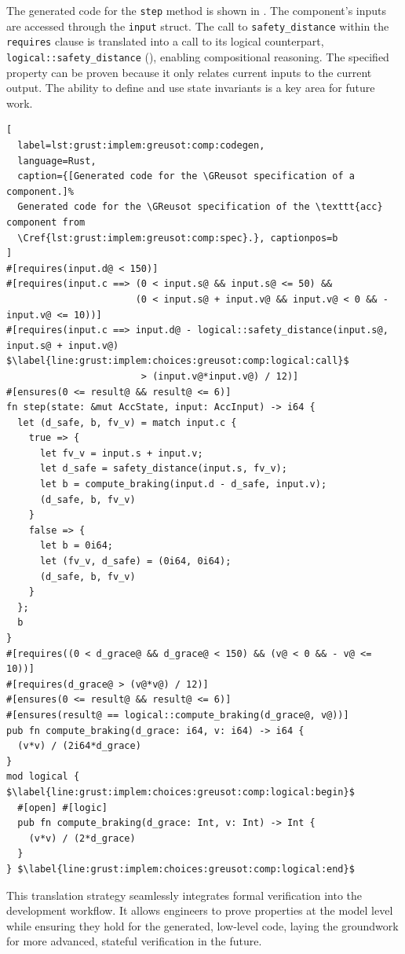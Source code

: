 The generated code for the \texttt{step} method is shown in
. The component's inputs are accessed through the
\texttt{input} struct. The call to \texttt{safety\_distance} within the \texttt{requires} clause is
translated into a call to its logical counterpart, \texttt{logical::safety\_distance}
(), enabling compositional reasoning.
The specified property can be proven because it only relates current inputs to the current output.
The ability to define and use state invariants is a key area for future work.

\begin{lstlisting}[
  label=lst:grust:implem:greusot:comp:codegen,
  language=Rust,
  caption={[Generated code for the \GReusot specification of a component.]%
  Generated code for the \GReusot specification of the \texttt{acc} component from
  \Cref{lst:grust:implem:greusot:comp:spec}.}, captionpos=b
]
#[requires(input.d@ < 150)]
#[requires(input.c ==> (0 < input.s@ && input.s@ <= 50) &&
                       (0 < input.s@ + input.v@ && input.v@ < 0 && - input.v@ <= 10))]
#[requires(input.c ==> input.d@ - logical::safety_distance(input.s@, input.s@ + input.v@) $\label{line:grust:implem:choices:greusot:comp:logical:call}$
                        > (input.v@*input.v@) / 12)]
#[ensures(0 <= result@ && result@ <= 6)]
fn step(state: &mut AccState, input: AccInput) -> i64 {
  let (d_safe, b, fv_v) = match input.c {
    true => {
      let fv_v = input.s + input.v;
      let d_safe = safety_distance(input.s, fv_v);
      let b = compute_braking(input.d - d_safe, input.v);
      (d_safe, b, fv_v)
    }
    false => {
      let b = 0i64;
      let (fv_v, d_safe) = (0i64, 0i64);
      (d_safe, b, fv_v)
    }
  };
  b
}
#[requires((0 < d_grace@ && d_grace@ < 150) && (v@ < 0 && - v@ <= 10))]
#[requires(d_grace@ > (v@*v@) / 12)]
#[ensures(0 <= result@ && result@ <= 6)]
#[ensures(result@ == logical::compute_braking(d_grace@, v@))]
pub fn compute_braking(d_grace: i64, v: i64) -> i64 {
  (v*v) / (2i64*d_grace)
}
mod logical { $\label{line:grust:implem:choices:greusot:comp:logical:begin}$
  #[open] #[logic]
  pub fn compute_braking(d_grace: Int, v: Int) -> Int {
    (v*v) / (2*d_grace)
  }
} $\label{line:grust:implem:choices:greusot:comp:logical:end}$
\end{lstlisting}

This translation strategy seamlessly integrates formal verification into the \GRust development
workflow. It allows engineers to prove properties at the model level while ensuring they hold for
the generated, low-level \Rust code, laying the groundwork for more advanced, stateful verification
in the future.

